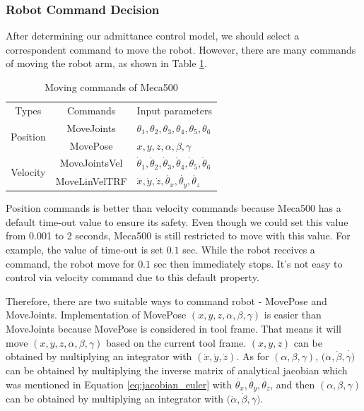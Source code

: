\subsubsection{Robot Command Decision}
\hspace*{6mm}After determining our admittance control model, we should select a correspondent command to move the robot. However, there are many commands of moving the robot arm, as shown in Table \ref{tab:commands}.
\begin{table}[htbp]
\centering
\tabcolsep=20pt
\caption{Moving commands of Meca500}
\label{tab:commands}
\begin{tabular}{|c|c|l|} 
\hline
\rowcolor{lightgray}Types						&Commands			&Input parameters\\
\cline{1-3}
\multirow{2}{*}{Position}					&MoveJoints			&\noindent $\theta _1, \theta _2 ,\theta _3 ,\theta _4 ,\theta _5 , \theta _6 $\\\cline{2-3}
											&MovePose			&\noindent$x,y,z,\alpha ,\beta ,\gamma $\\
\cline{1-3}
\multirow{2}{*}{Velocity}					&MoveJointsVel		&$\dot{\theta}_1, \dot{\theta}_2, \dot{\theta}_3,\dot{\theta}_4, \dot{\theta}_5 , \dot{\theta}_6 $\\\cline{2-3}
											&MoveLinVelTRF		&$\dot{x},\dot{y},\dot{z},\dot{\theta _x},\dot{\theta _y},\dot{\theta _z}$\\
\hline
\end{tabular}
\end{table}
\par
Position commands is better than velocity commands because Meca500 has a default time-out value to ensure its safety. Even though we could set this value from 0.001 to 2 seconds, Meca500 is still restricted to move with this value. For example, the value of time-out is set $0.1$ sec. While the robot receives a command, the robot move for $0.1$ sec then immediately stops. It's not easy to control via velocity command due to this default property.
\par
Therefore, there are two suitable ways to command robot - MovePose and MoveJoints. Implementation of MovePose $(x,y,z,\alpha ,\beta ,\gamma)$ is easier than MoveJoints because MovePose is considered in tool frame. That means it will move $(x,y,z,\alpha ,\beta ,\gamma)$ based on the current tool frame.  $(x,y,z)$ can be obtained by multiplying an integrator with $(\dot{x},\dot{y},\dot{z})$. As for $(\alpha ,\beta ,\gamma)$, $(\dot{\alpha} ,\dot{\beta} ,\dot{\gamma)}$ can be obtained by multiplying the inverse matrix of analytical jacobian which was mentioned in Equation \ref{eq:jacobian_euler} with $\dot{\theta _x},\dot{\theta _y},\dot{\theta _z}$, and then $(\alpha ,\beta ,\gamma)$ can be obtained by multiplying an integrator with $(\dot{\alpha} ,\dot{\beta} ,\dot{\gamma)}$.

